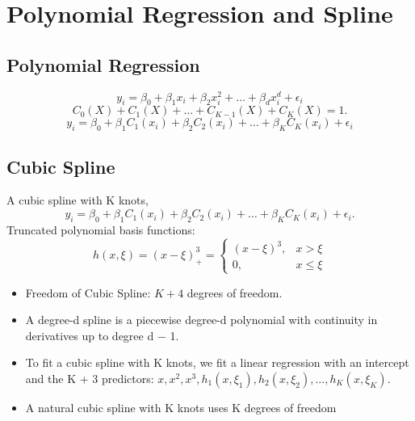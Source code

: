 \documentclass[a4paper,9pt,fleqn]{extarticle}
\begin{document}
\section{Polynomial Regression and Spline}
\begin{minipage}[t]{0.45\textwidth}
    \subsection*{Polynomial Regression}
        \[
            y_i = \beta_0 + \beta_1 x_i + \beta_2 x_i^2 + \ldots + \beta_d x_i^d + \epsilon_i
        \]
        \[
            C_0(X) + C_1(X) + \ldots + C_{K-1}(X) + C_K(X) = 1.
        \]
        \[
            y_i = \beta_0 + \beta_1C_1(x_i) + \beta_2C_2(x_i) + \ldots + \beta_KC_K(x_i) + \epsilon_i
        \]
\end{minipage}
\hspace{0.05\textwidth} 
\begin{minipage}[t]{0.45\textwidth}
    \subsection*{Cubic Spline}
        A cubic spline with K knots,
        \[
            y_i = \beta_0 + \beta_1C_1(x_i) + \beta_2C_2(x_i) + \ldots + \beta_KC_K(x_i) + \epsilon_i.
        \]
        Truncated polynomial basis functions:
        \[
            h(x, \xi ) =(x - \xi)^3_+ = \begin{cases}
                (x - \xi)^3, & x > \xi \\
                0, & x \leq \xi
            \end{cases}
        \]
\end{minipage}
\vspace{1em}
\begin{itemize}
    \item Freedom of Cubic Spline: \(K + 4\) degrees of freedom.
    \item  A degree-d spline is a piecewise degree-d polynomial with continuity
    in derivatives up to degree d − 1.
    \item To fit a cubic spline with K knots, we fit a linear regression with an
    intercept and the K + 3 predictors:
    \(
        x, x^2, x^3, h_1(x, \xi_1), h_2(x, \xi_2), \ldots, h_K(x, \xi_K).
    \)
    \item  A natural cubic spline with K knots uses K degrees of freedom
\end{itemize}
\end{document}
